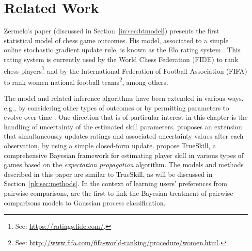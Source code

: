 \section{Related Work}
\label{pk:sec:relwork}

Zermelo's \citeyear{zermelo1928berechnung} paper (discussed in Section~\ref{in:sec:btmodel}) presents the first statistical model of chess game outcomes.
His model, associated to a simple online stochastic gradient update rule, is known as the Elo rating system \citep{elo1978rating}.
This rating system is currently used by the World Chess Federation (FIDE) to rank chess players\footnote{See: \url{https://ratings.fide.com/}.} and by the International Federation of Football Association (FIFA) to rank women national football teams\footnote{See: \url{http://www.fifa.com/fifa-world-ranking/procedure/women.html}.}, among others.

The model and related inference algorithms have been extended in various ways, e.g., by considering other types of outcomes \citep{rao1967ties, maher1982modelling} or by permitting parameters to evolve over time \citep{glickman1993paired, fahrmeir1994dynamic, cattelan2013dynamic}.
One direction that is of particular interest in this chapter is the handling of uncertainty of the estimated skill parameters.
\citet{glickman1999parameter} proposes an extension that simultaneously updates ratings and associated uncertainty values after each observation, by using a simple closed-form update.
\citet{herbrich2006trueskill} propose TrueSkill, a comprehensive Bayesian framework for estimating player skill in various types of games based on the \emph{expectation propagation} algorithm.
The models and methods described in this paper are similar to TrueSkill, as will be discussed in Section~\ref{pk:sec:methods}.
In the context of learning users' preferences from pairwise comparisons, \citet{chu2005preference} are the first to link the Bayesian treatment of pairwise comparisons models to Gaussian process classification.
